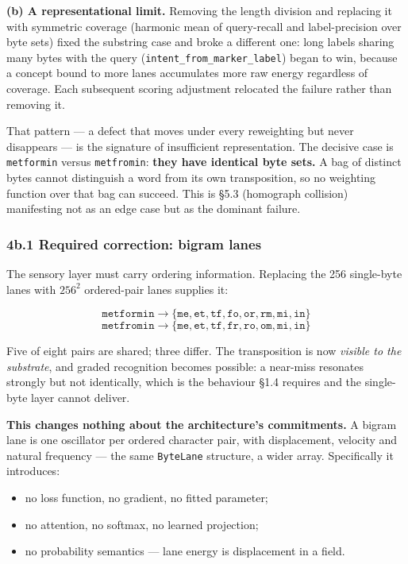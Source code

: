 \documentclass[
  11pt,
  a4paper,
]{article}
\providecommand{\tightlist}{%
  \setlength{\itemsep}{0pt}\setlength{\parskip}{0pt}}
\begin{document}
\textbf{(b) A representational limit.} Removing the length division and
replacing it with symmetric coverage (harmonic mean of query-recall and
label-precision over byte sets) fixed the substring case and broke a
different one: long labels sharing many bytes with the query
(\texttt{intent\_from\_marker\_label}) began to win, because a concept
bound to more lanes accumulates more raw energy regardless of coverage.
Each subsequent scoring adjustment relocated the failure rather than
removing it.

That pattern --- a defect that moves under every reweighting but never
disappears --- is the signature of insufficient representation. The
decisive case is \texttt{metformin} versus \texttt{metfromin}:
\textbf{they have identical byte sets.} A bag of distinct bytes cannot
distinguish a word from its own transposition, so no weighting function
over that bag can succeed. This is §5.3 (homograph collision)
manifesting not as an edge case but as the dominant failure.

\subsubsection{4b.1 Required correction: bigram
lanes}\label{b.1-required-correction-bigram-lanes}

The sensory layer must carry ordering information. Replacing the 256
single-byte lanes with \(256^2\) ordered-pair lanes supplies it:

\[
\texttt{metformin} \rightarrow \{\texttt{me},\texttt{et},\texttt{tf},\texttt{fo},\texttt{or},\texttt{rm},\texttt{mi},\texttt{in}\}
\] \[
\texttt{metfromin} \rightarrow \{\texttt{me},\texttt{et},\texttt{tf},\texttt{fr},\texttt{ro},\texttt{om},\texttt{mi},\texttt{in}\}
\]

Five of eight pairs are shared; three differ. The transposition is now
\emph{visible to the substrate}, and graded recognition becomes
possible: a near-miss resonates strongly but not identically, which is
the behaviour §1.4 requires and the single-byte layer cannot deliver.

\textbf{This changes nothing about the architecture's commitments.} A
bigram lane is one oscillator per ordered character pair, with
displacement, velocity and natural frequency --- the same
\texttt{ByteLane} structure, a wider array. Specifically it introduces:

\begin{itemize}
\tightlist
\item
  no loss function, no gradient, no fitted parameter;
\item
  no attention, no softmax, no learned projection;
\item
  no probability semantics --- lane energy is displacement in a field.
\end{itemize}
\end{document}

